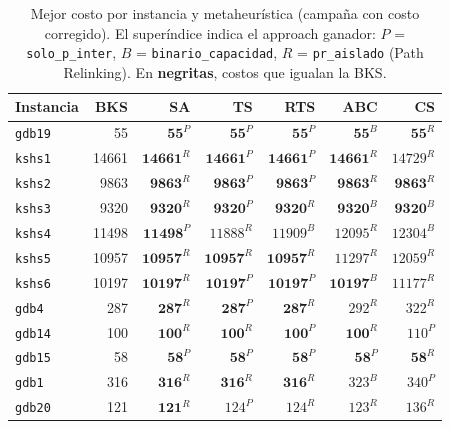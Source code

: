 \begin{table}[htbp]
\centering
\caption{Mejor costo por instancia y metaheurística (campaña con costo corregido). El superíndice indica el approach ganador: $P$ = \texttt{solo\_p\_inter}, $B$ = \texttt{binario\_capacidad}, $R$ = \texttt{pr\_aislado} (Path Relinking). En \textbf{negritas}, costos que igualan la BKS.}
\label{tab:mejores-por-instancia-costo-fixed}
\small
\begin{tabular}{lrrrrrr}
\toprule
Instancia & BKS & SA & TS & RTS & ABC & CS \\
\midrule
\texttt{gdb19} & 55 & $\mathbf{55}^{P}$ & $\mathbf{55}^{P}$ & $\mathbf{55}^{P}$ & $\mathbf{55}^{B}$ & $\mathbf{55}^{R}$ \\
\texttt{kshs1} & 14661 & $\mathbf{14661}^{R}$ & $\mathbf{14661}^{P}$ & $\mathbf{14661}^{P}$ & $\mathbf{14661}^{R}$ & $14729^{R}$ \\
\texttt{kshs2} & 9863 & $\mathbf{9863}^{R}$ & $\mathbf{9863}^{P}$ & $\mathbf{9863}^{P}$ & $\mathbf{9863}^{R}$ & $\mathbf{9863}^{R}$ \\
\texttt{kshs3} & 9320 & $\mathbf{9320}^{R}$ & $\mathbf{9320}^{P}$ & $\mathbf{9320}^{R}$ & $\mathbf{9320}^{B}$ & $\mathbf{9320}^{B}$ \\
\texttt{kshs4} & 11498 & $\mathbf{11498}^{P}$ & $11888^{R}$ & $11909^{B}$ & $12095^{R}$ & $12304^{B}$ \\
\texttt{kshs5} & 10957 & $\mathbf{10957}^{R}$ & $\mathbf{10957}^{R}$ & $\mathbf{10957}^{R}$ & $11297^{R}$ & $12059^{R}$ \\
\texttt{kshs6} & 10197 & $\mathbf{10197}^{R}$ & $\mathbf{10197}^{P}$ & $\mathbf{10197}^{P}$ & $\mathbf{10197}^{B}$ & $11177^{R}$ \\
\texttt{gdb4} & 287 & $\mathbf{287}^{R}$ & $\mathbf{287}^{P}$ & $\mathbf{287}^{R}$ & $292^{R}$ & $322^{R}$ \\
\texttt{gdb14} & 100 & $\mathbf{100}^{R}$ & $\mathbf{100}^{R}$ & $\mathbf{100}^{P}$ & $\mathbf{100}^{R}$ & $110^{P}$ \\
\texttt{gdb15} & 58 & $\mathbf{58}^{P}$ & $\mathbf{58}^{P}$ & $\mathbf{58}^{P}$ & $\mathbf{58}^{P}$ & $\mathbf{58}^{R}$ \\
\texttt{gdb1} & 316 & $\mathbf{316}^{R}$ & $\mathbf{316}^{R}$ & $\mathbf{316}^{R}$ & $323^{B}$ & $340^{P}$ \\
\texttt{gdb20} & 121 & $\mathbf{121}^{R}$ & $124^{P}$ & $124^{R}$ & $123^{R}$ & $136^{R}$ \\

\end{tabular}
\end{table}
